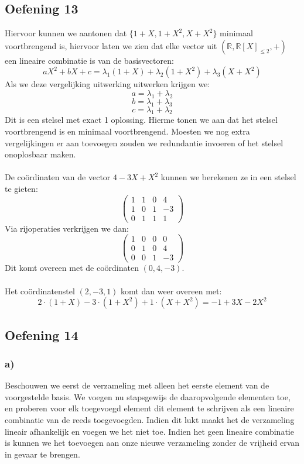 \documentclass[lineaire_algebra_oplossingen.tex]{subfiles}
\begin{document}
\subsection{Oefening 13}
Hiervoor kunnen we aantonen dat $\{1+X,1+X^2,X+X^2\}$ minimaal voortbrengend is, hiervoor laten we zien dat elke vector uit  $(\mathbb{R},\mathbb{R}[X]_{\leq 2},+)$ een lineaire combinatie is van de basisvectoren:
$$aX^2 + bX + c = \lambda_{1} (1+X) + \lambda_{2} (1+X^2) + \lambda_{3} (X+X^2)$$
Als we deze vergelijking uitwerking uitwerken krijgen we:
$$a = \lambda_{1} + \lambda_2$$
$$b = \lambda_1 + \lambda_3$$
$$c = \lambda_1 + \lambda_2$$
Dit is een stelsel met exact 1 oplossing. Hierme tonen we aan dat het stelsel voortbrengend is en minimaal voortbrengend. Moesten we nog extra vergelijkingen er aan toevoegen zouden we redundantie invoeren of het stelsel onoplosbaar maken.
\\
\\
De co\"ordinaten van de vector $4 -3X + X^2$ kunnen we berekenen ze in een stelsel te gieten:
$$
\begin{pmatrix}
1&1&0&4\\
1&0&1&-3\\
0&1&1&1
\end{pmatrix}
$$
Via rijoperaties verkrijgen we dan:
$$
\begin{pmatrix}
1&0&0&0\\
0&1&0&4\\
0&0&1&-3
\end{pmatrix}
$$
Dit komt overeen met de co\"ordinaten $(0,4,-3)$.
\\
\\
Het co\"ordinatenstel $(2,-3,1)$ komt dan weer overeen met:
$$
2\cdot (1+X) -3 \cdot (1+X^2)+ 1\cdot (X+X^2)= -1 +3X-2X^2
$$

\subsection{Oefening 14}

\subsubsection*{a)}
Beschouwen we eerst de verzameling met alleen het eerste element van de voorgestelde basis. We voegen nu stapsgewijs de daaropvolgende elementen toe, en proberen voor elk toegevoegd element dit element te schrijven als een lineaire combinatie van de reeds toegevoegden. Indien dit lukt maakt het de verzameling lineair afhankelijk en voegen we het niet toe. Indien het geen lineaire combinatie is kunnen we het toevoegen aan onze nieuwe verzameling zonder de vrijheid ervan in gevaar te brengen.\\
\end{document}
